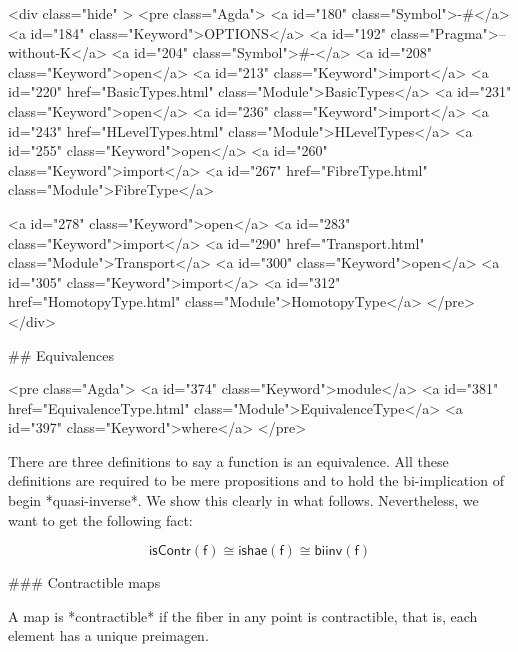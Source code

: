   <div class="hide" >
<pre class="Agda">
<a id="180" class="Symbol">{-#</a> <a id="184" class="Keyword">OPTIONS</a> <a id="192" class="Pragma">--without-K</a> <a id="204" class="Symbol">#-}</a>
<a id="208" class="Keyword">open</a> <a id="213" class="Keyword">import</a> <a id="220" href="BasicTypes.html" class="Module">BasicTypes</a>
<a id="231" class="Keyword">open</a> <a id="236" class="Keyword">import</a> <a id="243" href="HLevelTypes.html" class="Module">HLevelTypes</a>
<a id="255" class="Keyword">open</a> <a id="260" class="Keyword">import</a> <a id="267" href="FibreType.html" class="Module">FibreType</a>

<a id="278" class="Keyword">open</a> <a id="283" class="Keyword">import</a> <a id="290" href="Transport.html" class="Module">Transport</a>
<a id="300" class="Keyword">open</a> <a id="305" class="Keyword">import</a> <a id="312" href="HomotopyType.html" class="Module">HomotopyType</a>
</pre>
</div>

## Equivalences

<pre class="Agda">
<a id="374" class="Keyword">module</a> <a id="381" href="EquivalenceType.html" class="Module">EquivalenceType</a> <a id="397" class="Keyword">where</a>
</pre>

There are three definitions to say a function is an
equivalence. All these definitions
are required to be mere propositions and to hold
the bi-implication of begin *quasi-inverse*. We show
this clearly in what follows. Nevertheless, we want to get
the following fact:

$$ \mathsf{isContr(f)} \cong \mathsf{ishae(f)} \cong \mathsf{biinv(f)} $$

### Contractible maps

A map is *contractible* if the fiber in any point is contractible, that is, each
element has a unique preimagen.

